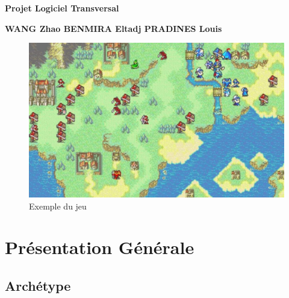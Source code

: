 \documentclass[a4paper,12pt]{article}
\begin{document}
\thispagestyle{empty}

\begin{titlepage}

\vspace*{2cm}

\begin{center}\textbf{\Huge Projet Logiciel Transversal}\end{center}{\Large \par}

\begin{center}\textbf{\large WANG Zhao BENMIRA Eltadj PRADINES Louis}\end{center}{\large \par}

\vspace{2cm}

\begin{figure}[h]
\begin{center}
\includegraphics[width=\textwidth]{exemple.jpg}
\caption{\label{pacmangame}Exemple du jeu}
\end{center}
\end{figure}

\clearpage

{\small
\tableofcontents
}

\end{titlepage}

\clearpage
\section{Présentation Générale}

\subsection{Archétype}
\end{document}
